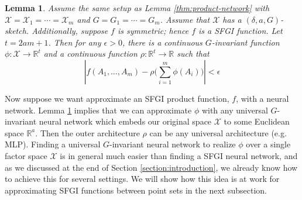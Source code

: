 \documentclass[12pt]{article}
\newcommand{\R}{\mathbb R}
\newtheorem{theorem}{Theorem}[section]
\newtheorem{lemma}[theorem]{Lemma}
\newcommand{\SFGI} {{SFGI}}
\begin{document}
\begin{lemma}
\label{thm:deep-set-final-step}
    Assume the same setup as Lemma \ref{thm:product-network} with $\mathcal{X} = \mathcal{X}_1 = \cdots = \mathcal{X}_m$ and $G = G_1 = \cdots = G_m$. Assume that $\mathcal{X}$ has a $(\delta, a, G)$-sketch. Additionally, suppose $f$ is symmetric; hence $f$ is a \SFGI{} function. Let $t = 2am + 1$. Then for any $\epsilon > 0$, there is a continuous $G$-invariant function $\phi: \mathcal{X} \to \R^t$ and a {continuous} function $\rho: \R^t \to \R$ such that 
    \begin{equation*}
        |f(A_1, \dots, A_m) - \rho\Big(\sum_{i = 1}^m \phi(A_i)\Big)| < \epsilon
    \end{equation*}
\end{lemma}
Now suppose we want approximate an \SFGI{} product function, $f$, with a neural network. 
Lemma \ref{thm:deep-set-final-step} implies that we can approximate $\phi$ with any universal $G$-invariant neural network which embeds our original space $\mathcal{X}$ to some Euclidean space $\R^a$. 
Then the outer architecture $\rho$ can be any universal architecture (e.g. MLP). 
Finding a universal $G$-invariant neural network to realize $\phi$ over a single factor space $\mathcal{X}$ is in general much easier than finding a \SFGI{} neural network, and as we discussed at the end of Section \ref{section:introduction}, we already know how to achieve this for several settings. 
We will show how this idea is at work for approximating \SFGI{} functions between point sets in the next subsection. 

    
\end{document}
